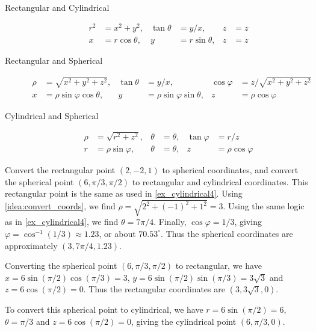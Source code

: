 {
\begin{keyidea}\label{idea:convert_coords}
\mbox{}\\[-\baselineskip]
\begin{description}
\item[Rectangular and Cylindrical]
\begin{align*}
r^2 &= x^2+y^2, & \tan \theta &= y/x, & z&=z\\
x&=r\cos \theta, & y&=r\sin\theta, & z&=z
\end{align*}

\item[Rectangular and Spherical]
\begin{align*}
\rho &= \sqrt{x^2+y^2+z^2}, & \tan \theta &= y/x, & \cos \varphi &= z/\sqrt{x^2+y^2+z^2}\\
x&=\rho\sin\varphi\cos\theta, & y&=\rho\sin\varphi\sin\theta, & z&=\rho\cos\varphi
\end{align*}

\item[Cylindrical and Spherical]
\begin{align*}
\rho&=\sqrt{r^2+z^2}, & \theta &= \theta,& \tan \varphi &= r/z \\
r&=\rho \sin \varphi, & \theta &= \theta, & z&=\rho\cos\varphi
\end{align*}
\end{description}
\end{keyidea}
}


\begin{example}\label{ex_spherical4}
Convert the rectangular point $(2,-2,1)$ to spherical coordinates, and convert the spherical point $(6,\pi/3,\pi/2)$ to rectangular and cylindrical coordinates.
\solution
This rectangular point is the same as used in \autoref{ex_cylindrical4}. Using \autoref{idea:convert_coords}, we find $\rho = \sqrt{2^2+(-1)^2+1^2} = 3$. Using the same logic as in \autoref{ex_cylindrical4}, we find $\theta = 7\pi/4$. Finally, $\cos\varphi = 1/3$, giving $\varphi = \cos^{-1}(1/3) \approx 1.23$, or about $70.53^\circ$. Thus the spherical coordinates are approximately $(3,7\pi/4,1.23)$.

Converting the spherical point $(6,\pi/3,\pi/2)$ to rectangular, we have $x = 6\sin(\pi/2)\cos(\pi/3) = 3$, $y = 6\sin(\pi/2)\sin(\pi/3) = 3\sqrt{3}$ and $z = 6\cos(\pi/2) = 0$. Thus the rectangular coordinates are $(3,3\sqrt{3},0)$.

To convert this spherical point to cylindrical, we have $r = 6\sin(\pi/2) = 6$, $\theta = \pi/3$ and $z = 6\cos(\pi/2) =0$, giving the cylindrical point $(6,\pi/3,0)$.
\end{example}

